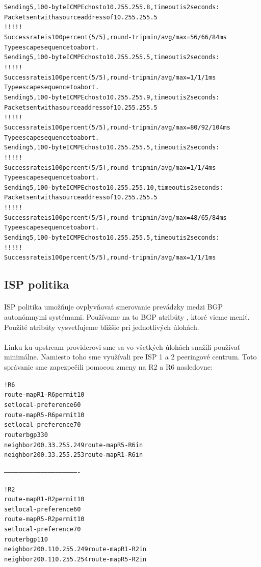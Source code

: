 \documentclass[12pt,twoside,a4paper]{report}
\begin{document}
{\begin{small}
\begin{alltt}
Sending 5, 100-byte ICMP Echos to 10.255.255.8, timeout is 2 seconds:
Packet sent with a source address of 10.255.255.5 
!!!!!
Success rate is 100 percent (5/5), round-trip min/avg/max = 56/66/84 ms
Type escape sequence to abort.
Sending 5, 100-byte ICMP Echos to 10.255.255.5, timeout is 2 seconds:
!!!!!
Success rate is 100 percent (5/5), round-trip min/avg/max = 1/1/1 ms
Type escape sequence to abort.
Sending 5, 100-byte ICMP Echos to 10.255.255.9, timeout is 2 seconds:
Packet sent with a source address of 10.255.255.5 
!!!!!
Success rate is 100 percent (5/5), round-trip min/avg/max = 80/92/104 ms
Type escape sequence to abort.
Sending 5, 100-byte ICMP Echos to 10.255.255.5, timeout is 2 seconds:
!!!!!
Success rate is 100 percent (5/5), round-trip min/avg/max = 1/1/4 ms
Type escape sequence to abort.
Sending 5, 100-byte ICMP Echos to 10.255.255.10, timeout is 2 seconds:
Packet sent with a source address of 10.255.255.5 
!!!!!
Success rate is 100 percent (5/5), round-trip min/avg/max = 48/65/84 ms
Type escape sequence to abort.
Sending 5, 100-byte ICMP Echos to 10.255.255.5, timeout is 2 seconds:
!!!!!
Success rate is 100 percent (5/5), round-trip min/avg/max = 1/1/1 ms
\end{alltt}
\end{small}
}


\newpage

\subsection{ISP politika}
\paragraph{}
ISP politika umožňuje ovplyvňovať smerovanie prevádzky medzi BGP autonómnymi systémami. Používame na to BGP atribúty , ktoré vieme meniť. Použité atribúty vysvetľujeme bližšie pri jednotlivých úlohách.

\paragraph{}
Linku ku upstream providerovi sme sa vo všetkých úlohách snažili používať minimálne. Namiesto toho sme využívali pre ISP 1 a 2 peeringové centrum. Toto správanie sme zapezpečili pomocou zmeny  na R2 a R6 nasledovne:

\noindent
{\selectfont
\begin{small}
\begin{alltt}
!R6
route-map R1-R6 permit 10
  set local-preference 60
route-map R5-R6 permit 10
  set local-preference 70
router bgp 330
  neighbor 200.33.255.249 route-map R5-R6 in
  neighbor 200.33.255.253 route-map R1-R6 in


-------------------------------------------------------------


!R2
route-map R1-R2 permit 10
  set local-preference 60
route-map R5-R2 permit 10
  set local-preference 70
router bgp 110
  neighbor 200.110.255.249 route-map R1-R2 in
  neighbor 200.110.255.254 route-map R5-R2 in
\end{alltt}
\end{small}
}
\end{document}
